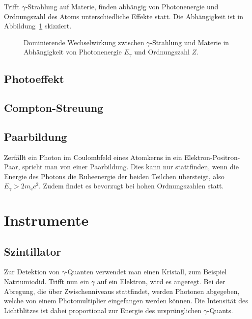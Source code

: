 Trifft $\gamma$-Strahlung auf Materie, finden abhängig von Photonenergie und
Ordnungszahl des Atoms unterschiedliche Effekte statt. Die Abhängigkeit ist in
Abbildung~\ref{fig:wechselwirkung} skizziert.
\begin{figure}
    \centering
    \caption{%
        Dominierende Wechselwirkung zwischen $\gamma$-Strahlung und Materie in
        Abhängigkeit von Photonenergie $E_\gamma$ und Ordnungszahl
        $Z$.%
    }
    \label{fig:wechselwirkung}
\end{figure}

\subsection{Photoeffekt}

\subsection{Compton-Streuung}

\subsection{Paarbildung}

Zerfällt ein Photon im Coulombfeld eines Atomkerns in ein
Elektron-Positron-Paar, spricht man von einer Paarbildung. Dies kann nur
stattfinden, wenn die Energie des Photons die Ruheenergie der beiden Teilchen
übersteigt, also $E_\gamma > 2m_\mathrm{e}c^2$. Zudem findet es bevorzugt bei
hohen Ordnungszahlen statt.

\section{Instrumente}

\subsection{Szintillator}

Zur Detektion von $\gamma$-Quanten verwendet man einen Kristall, zum Beispiel
Natriumiodid. Trifft nun ein $\gamma$ auf ein Elektron, wird es angeregt. Bei
der Abregung, die über Zwischenniveaus stattfindet, werden Photonen abgegeben,
welche von einem Photomultiplier eingefangen werden können. Die Intensität des
Lichtblitzes ist dabei proportional zur Energie des ursprünglichen
$\gamma$-Quants.

